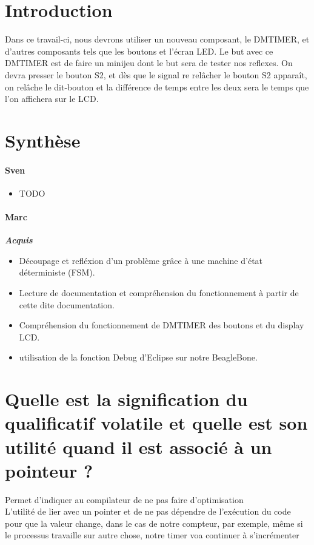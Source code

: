 \section{Introduction}
Dans ce travail-ci, nous devrons utiliser un nouveau composant, le DMTIMER, et d'autres composants tels que les boutons et l'écran LED. Le but avec ce DMTIMER est de faire un minijeu dont le but sera de tester nos reflexes. On devra presser le bouton S2, et dès que le signal re relâcher le bouton S2 apparaît, on relâche le dit-bouton et la différence de temps entre les deux sera le temps que l'on affichera sur le LCD.
\section{Synthèse}

\paragraph{Sven}
\begin{itemize}
   \item TODO
\end{itemize}

\paragraph{Marc}
\textbf{\textit{Acquis}}
\begin{itemize}
   \item Découpage et refléxion d'un problème grâce à une machine d'état déterministe (FSM).
   \item Lecture de documentation et compréhension du fonctionnement à partir de cette dite documentation.
   \item Compréhension du fonctionnement de DMTIMER des boutons et du display LCD.
   \item utilisation de la fonction Debug d'Eclipse sur notre BeagleBone.
\end{itemize}
 

\section{Quelle est la signification du qualificatif volatile et quelle est son utilité quand il est associé à un pointeur ?}
Permet d'indiquer au compilateur de ne pas faire d'optimisation \\
L'utilité de lier avec un pointer et de ne pas dépendre de l'exécution du code pour que la valeur change, dans le cas de notre compteur, par exemple, même si le processus travaille sur autre chose, notre timer voa continuer à s'incrémenter
 
